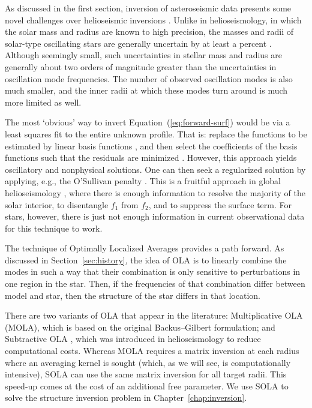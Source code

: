 As discussed in the first section, inversion of asteroseismic data presents some novel challenges over helioseismic inversions \citep[e.g.,][]{2014aste.book...87B}. 
Unlike in helioseismology, in which the solar mass and radius are known to high precision, the masses and radii of solar-type oscillating stars are generally uncertain by at least a percent \citep[see e.g.,][see also Figure~\ref{fig:posterior-cdf}]{2013MNRAS.433.1262W,2015MNRAS.452.2127S,2016apj...830...31b}. 
Although seemingly small, such uncertainties in stellar mass and radius are generally about two orders of magnitude greater than the uncertainties in oscillation mode frequencies. 
The number of observed oscillation modes is also much smaller, and the inner radii at which these modes turn around is much more limited as well. 

The most `obvious' way to invert Equation~(\ref{eq:forward-surf}) would be via a least squares fit to the entire unknown profile. 
That is: replace the functions to be estimated by linear basis functions \citep[e.g., cubic B-splines,][]{de1972calculating}, and then select the coefficients of the basis functions such that the residuals are minimized \citep[e.g.,][]{basuchaplin2017}. 
However, this approach yields oscillatory and nonphysical solutions. 
One can then seek a regularized solution by applying, e.g., the O'Sullivan penalty \citep{o1986automatic}. 
This is a fruitful approach in global helioseismology \citep[e.g.,][]{1990MNRAS.244..542D}, where there is enough information to resolve the majority of the solar interior, to disentangle $f_1$ from $f_2$, and to suppress the surface term. 
For stars, however, there is just not enough information in current observational data for this technique to work. 

The technique of Optimally Localized Averages \citep[OLA,][]{1968GeoJ...16..169B,1970RSPTA.266..123B} provides a path forward. 
As discussed in Section~\ref{sec:history}, the idea of OLA is to linearly combine the modes in such a way that their combination is only sensitive to perturbations in one region in the star. 
Then, if the frequencies of that combination differ between model and star, then the structure of the star differs in that location. 

There are two variants of OLA that appear in the literature: Multiplicative OLA (MOLA), which is based on the original Backus--Gilbert formulation; and Subtractive OLA \citep[SOLA,][]{1992A&A...262L..33P, 1994A&A...281..231P}, which was introduced in helioseismology to reduce computational costs. 
Whereas MOLA requires a matrix inversion at each radius where an averaging kernel is sought (which, as we will see, is computationally intensive), SOLA can use the same matrix inversion for all target radii. 
This speed-up comes at the cost of an additional free parameter. 
We use SOLA to solve the structure inversion problem in Chapter~\ref{chap:inversion}. 

